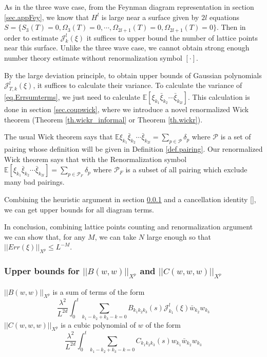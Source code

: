 As in the three wave case, from the Feynman diagram representation in section \ref{sec.appFey}, we know that $H^l$ is large near a surface given by $2l$ equations $S=\{S_{3}(T)=0,\Omega_{3}(T)=0,\cdots,\Omega_{2l+1}(T)=0,\Omega_{2l+1}(T)=0\}$. Then in order to estimate $\mathcal{J}_k^l(\xi)$ it suffices to upper bound the number of lattice points near this surface. Unlike the three wave case, we cannot obtain strong enough number theory estimate without renormalization symbol $[\cdot]$.



By the large deviation principle, to obtain upper bounds of Gaussian polynomials $\mathcal{J}_{T,k}^l(\xi)$, it suffices to calculate their variance. To calculate the variance of \eqref{eq.Errsumterms}, we just need to calculate $\mathbb{E}[\xi_{k_1}\bar{\xi}_{k_2}\cdots\bar{\xi}_{k_{2l}}]$. This calculation is done in section \ref{sec.coupwick}, where we introduce a novel renormalized Wick theorem (Theorem \ref{th.wickr_informal} or Theorem \ref{th.wickr}).

The usual Wick theorem says that $\mathbb{E}\xi_{k_1}\bar{\xi}_{k_2}\cdots\bar{\xi}_{k_{2l}}=\sum_{p\in \mathcal{P}}\delta_p$ where $\mathcal{P}$ is a set of pairing whose definition will be given in Definition \ref{def.pairing}. Our renormalized Wick theorem says that with the Renormalization symbol $\mathbb{E}[\xi_{k_1}\bar{\xi}_{k_2}\cdots\bar{\xi}_{k_{2l}}]=\sum_{p\in \mathcal{P}_F}\delta_p$ where $\mathcal{P}_F$ is a subset of all pairing which exclude many bad pairings.

Combining the heuristic argument in section \ref{} and a cancellation identity \eqref{}, we can get upper bounds for all diagram terms.

In conclusion, combining lattice points counting and renormalization argument we can show that, for any $M$, we can take $N$ large enough so that $||Err(\xi)||_{X^p}\le L^{-M}$.





\subsubsection{Upper bounds for $||B(w,w)||_{X^p}$ and $||C(w,w,w)||_{X^p}$} $||B(w,w)||_{X^p}$ is a sum of terms of the form
\begin{equation}
    \frac{\lambda^2}{L^{2d}} \int^{t}_0\sum_{k_1-k_2+k_3-k=0} B_{k_1k_2k_3}(s)  \mathcal{J}^{l}_{k_1}(\xi)\bar{w}_{k_2}w_{k_3}
\end{equation}
$||C(w,w,w)||_{X^p}$ is a cubic polynomial of $w$ of the form
\begin{equation}
    \frac{\lambda^2}{L^{2d}} \int^{t}_0\sum_{k_1-k_2+k_3-k=0} C_{k_1k_2k_3}(s)  w_{k_1}\bar{w}_{k_2}w_{k_3}
\end{equation}

